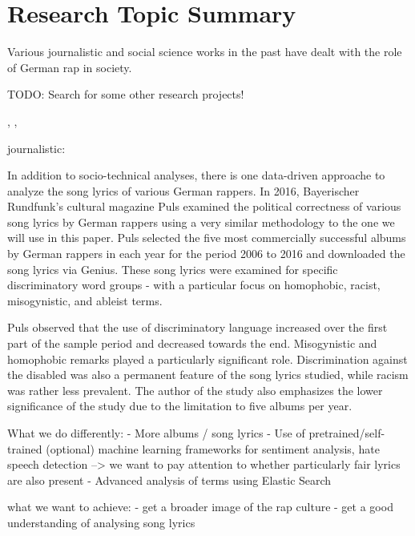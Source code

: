 \section{Research Topic Summary}\label{sec:research}

Various journalistic and social science works in the past have dealt with the role of German rap in society.

TODO: Search for some other research projects!

\cite{heinisch2018schlampe},
\cite{ahlers_2019},
\cite{wiegel2011deutscher}

journalistic:
\cite{rohwer_2020}

In addition to socio-technical analyses, there is one data-driven approache to analyze the song lyrics of various German rappers. In 2016, Bayerischer Rundfunk's cultural magazine Puls \cite{puls_2016} examined the political correctness of various song lyrics by German rappers using a very similar methodology to the one we will use in this paper. Puls selected the five most commercially successful albums by German rappers in each year for the period 2006 to 2016 and downloaded the song lyrics via Genius. These song lyrics were examined for specific discriminatory word groups - with a particular focus on homophobic, racist, misogynistic, and ableist terms.

Puls observed that the use of discriminatory language increased over the first part of the sample period and decreased towards the end. Misogynistic and homophobic remarks played a particularly significant role. Discrimination against the disabled was also a permanent feature of the song lyrics studied, while racism was rather less prevalent. The author of the study also emphasizes the lower significance of the study due to the limitation to five albums per year.

What we do differently:
- More albums / song lyrics
- Use of pretrained/self-trained (optional) machine learning frameworks for sentiment analysis, hate speech detection --> we want to pay attention to whether particularly fair lyrics are also present
- Advanced analysis of terms using Elastic Search

what we want to achieve: 
- get a broader image of the rap culture
- get a good understanding of analysing song lyrics

